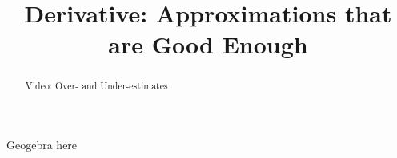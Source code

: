 \documentclass[handout]{ximera}
\title{Derivative: Approximations that are Good Enough}
\begin{document}
\begin{abstract} Video: Over- and Under-estimates %
\end{abstract}

\maketitle

Geogebra here
\end{document}

